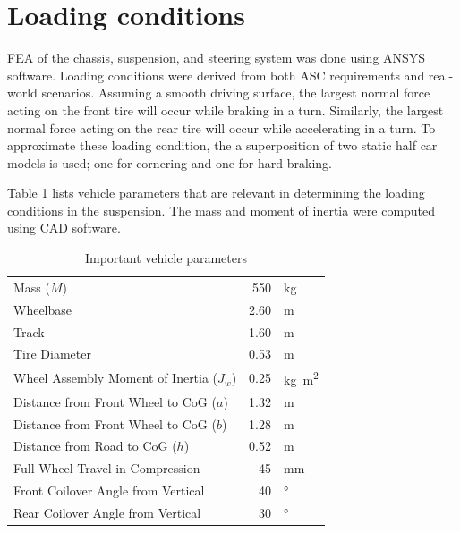 \documentclass[10pt]{article}
\begin{document}

\clearpage
\appendix
\section{Loading conditions}
\label{sec:loading-conditions}
FEA of the chassis, suspension, and steering system was done using ANSYS software. Loading conditions were derived from both ASC requirements and real-world scenarios. Assuming a smooth driving surface, the largest normal force acting on the front tire will occur while braking in a turn. Similarly, the largest normal force acting on the rear tire will occur while accelerating in a turn. To approximate these loading condition, the a superposition of two static half car models is used; one for cornering and one for hard braking.

Table \ref{tab:loading-conditions-params} lists vehicle parameters that are relevant in determining the loading conditions in the suspension. The mass and moment of inertia were computed using CAD software. 

\begin{table}[hbp]
\centering
\begin{tabular}{lrl}
\toprule
Mass ($M$)                                  &  550 & \si{\kilo\gram}              \\
Wheelbase                                   & 2.60 & \si{\metre}                  \\
Track                                       & 1.60 & \si{\metre}                  \\
Tire Diameter                               & 0.53 & \si{\metre}                  \\
Wheel Assembly Moment of Inertia ($J_w$)    & 0.25 & \si{\kilogram\metre\squared} \\
Distance from Front Wheel to CoG ($a$)      & 1.32 & \si{\metre}                  \\
Distance from Front Wheel to CoG ($b$)      & 1.28 & \si{\metre}                  \\
Distance from Road to CoG ($h$)             & 0.52 & \si{\metre}                  \\
Full Wheel Travel in Compression            &   45 & \si{\milli\metre}            \\
Front Coilover Angle from Vertical          &   40 & \si{\degree}                 \\
Rear Coilover Angle from Vertical           &   30 & \si{\degree}                 \\
\bottomrule
\end{tabular}
\caption{Important vehicle parameters}
\label{tab:loading-conditions-params}
\end{table}
\end{document}
